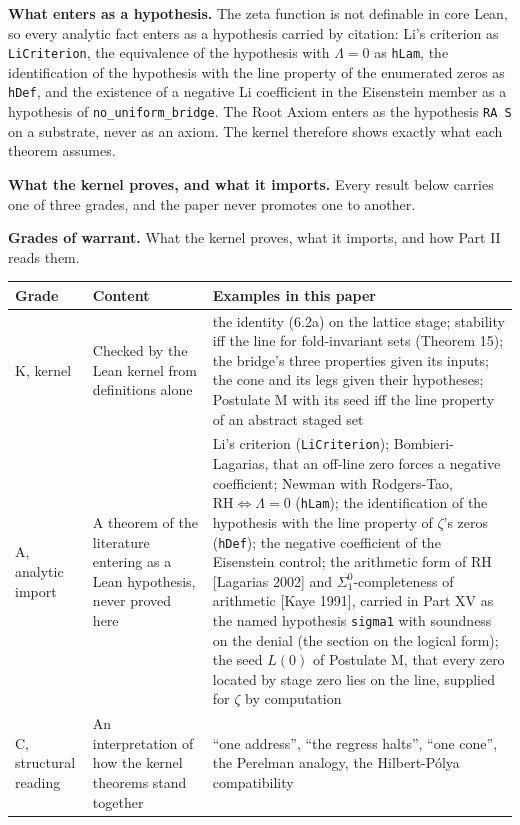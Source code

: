 \documentclass[10pt,twocolumn]{article}
\begin{document}
\textbf{What enters as a hypothesis.} The zeta function is not definable
in core Lean, so every analytic fact enters as a hypothesis carried by
citation: Li's criterion as \texttt{LiCriterion}, the equivalence of the
hypothesis with \(\Lambda = 0\) as \texttt{hLam}, the identification of
the hypothesis with the line property of the enumerated zeros as
\texttt{hDef}, and the existence of a negative Li coefficient in the
Eisenstein member as a hypothesis of \texttt{no\_uniform\_bridge}. The
Root Axiom enters as the hypothesis \texttt{RA\ S} on a substrate, never
as an axiom. The kernel therefore shows exactly what each theorem
assumes.

\textbf{What the kernel proves, and what it imports.} Every result below
carries one of three grades, and the paper never promotes one to
another.

\begin{table}[!t]
\centering\small
\renewcommand{\arraystretch}{1.12}
\raggedright \textbf{Grades of warrant.} What the kernel proves, what it imports, and how Part II reads them.\par\smallskip
\begin{tabularx}{\textwidth}{@{}P{0.13\textwidth} P{0.22\textwidth} L@{}}
\toprule
\textbf{Grade} & \textbf{Content} & \textbf{Examples in this paper} \\
\midrule
K, kernel & Checked by the Lean kernel from definitions alone & the identity (6.2a) on the lattice stage; stability iff the line for fold-invariant sets (Theorem 15); the bridge's three properties given its inputs; the cone and its legs given their hypotheses; Postulate M with its seed iff the line property of an abstract staged set \\
A, analytic import & A theorem of the literature entering as a Lean hypothesis, never proved here & Li's criterion (\texttt{LiCriterion}); Bombieri-Lagarias, that an off-line zero forces a negative coefficient; Newman with Rodgers-Tao, \(\mathrm{RH} \iff \Lambda = 0\) (\texttt{hLam}); the identification of the hypothesis with the line property of \(\zeta\)'s zeros (\texttt{hDef}); the negative coefficient of the Eisenstein control; the arithmetic form of RH {[}Lagarias 2002{]} and \(\Sigma^0_1\)-completeness of arithmetic {[}Kaye 1991{]}, carried in Part XV as the named hypothesis \texttt{sigma1} with soundness on the denial (the section on the logical form); the seed \(L(0)\) of Postulate M, that every zero located by stage zero lies on the line, supplied for \(\zeta\) by computation \\
C, structural reading & An interpretation of how the kernel theorems stand together & ``one address'', ``the regress halts'', ``one cone'', the Perelman analogy, the Hilbert-Pólya compatibility \\
\bottomrule
\end{tabularx}
\end{table}
\end{document}
